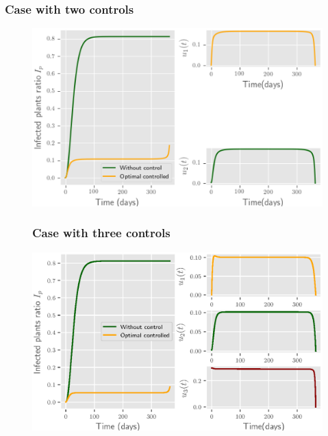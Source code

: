 	\begin{frame}[plain]
		\frametitle{Case with two controls}
		\begin{figure}
			\centering	
			\includegraphics[scale=0.5]{Feathergraphics/two_control_simulation_1.eps}
		\end{figure}	
	\end{frame}
	\begin{frame}
		\begin{figure}
			\frametitle{Case with three controls}
			\centering	
			\includegraphics[scale=0.5]{Feathergraphics/three_controls_simulation_1.eps}
		\end{figure}	
	\end{frame}
